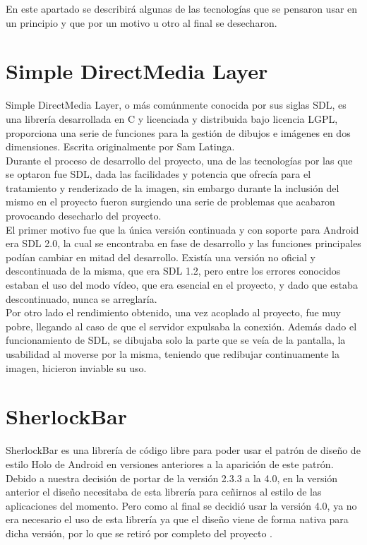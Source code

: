 En este apartado se describirá algunas de las tecnologías que se pensaron usar en un principio y que por un motivo u otro al final se desecharon.

\section{Simple DirectMedia Layer}

Simple DirectMedia Layer, o más comúnmente conocida por sus siglas SDL, es una librería desarrollada en C y licenciada y distribuida bajo licencia LGPL, proporciona una serie de funciones para la gestión de dibujos e imágenes en dos dimensiones. Escrita originalmente por Sam Latinga.\\

Durante el proceso de desarrollo del proyecto, una de las tecnologías por las que se optaron fue SDL, dada las facilidades y potencia que ofrecía para el tratamiento y renderizado de la imagen, sin embargo durante la inclusión del mismo en el proyecto fueron surgiendo una serie de problemas que acabaron provocando desecharlo del proyecto.\\

El primer motivo fue que la única versión continuada y con soporte para Android era SDL 2.0, la cual se encontraba en fase de desarrollo y las funciones principales podían cambiar en mitad del desarrollo. Existía una versión no oficial y descontinuada de la misma, que era SDL 1.2, pero entre los errores conocidos estaban el uso del modo vídeo, que era esencial en el proyecto, y dado que estaba descontinuado, nunca se arreglaría.\\

Por otro lado el rendimiento obtenido, una vez acoplado al proyecto, fue muy pobre, llegando al caso de que el servidor expulsaba la conexión. Además dado el funcionamiento de SDL, se dibujaba solo la parte que se veía de la pantalla, la usabilidad al moverse por la misma, teniendo que redibujar continuamente la imagen, hicieron inviable su uso.

\section{SherlockBar}

SherlockBar es una librería de código libre para poder usar el patrón de diseño de estilo Holo de Android en versiones anteriores a la aparición de este patrón. Debido a nuestra decisión de portar de la versión 2.3.3 a la 4.0, en la versión anterior el diseño necesitaba de esta librería para ceñirnos al estilo de las aplicaciones del momento. Pero como al final se decidió usar la versión 4.0, ya no era necesario el uso de esta librería ya que el diseño viene de forma nativa para dicha versión, por lo que se retiró por completo del proyecto \cite{sherlock:sherlock}.
